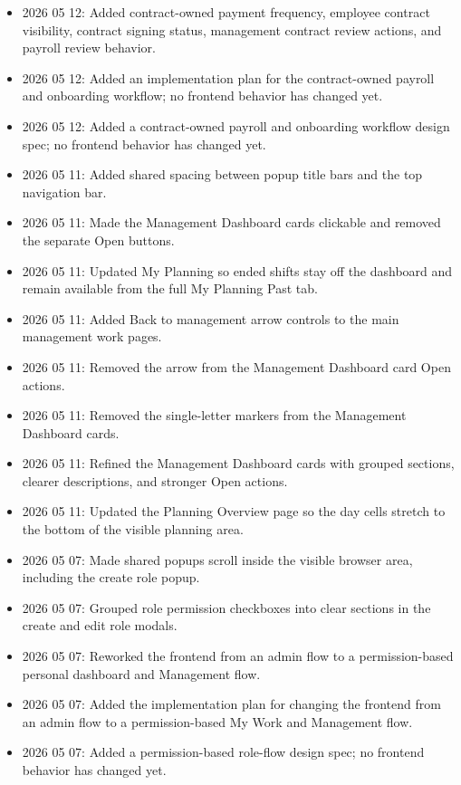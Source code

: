 \documentclass[11pt]{article}
\begin{document}
\begin{itemize}
    \item 2026 05 12: Added contract-owned payment frequency, employee contract visibility, contract signing status, management contract review actions, and payroll review behavior.
    \item 2026 05 12: Added an implementation plan for the contract-owned payroll and onboarding workflow; no frontend behavior has changed yet.
    \item 2026 05 12: Added a contract-owned payroll and onboarding workflow design spec; no frontend behavior has changed yet.
    \item 2026 05 11: Added shared spacing between popup title bars and the top navigation bar.
    \item 2026 05 11: Made the Management Dashboard cards clickable and removed the separate Open buttons.
    \item 2026 05 11: Updated My Planning so ended shifts stay off the dashboard and remain available from the full My Planning Past tab.
    \item 2026 05 11: Added Back to management arrow controls to the main management work pages.
    \item 2026 05 11: Removed the arrow from the Management Dashboard card Open actions.
    \item 2026 05 11: Removed the single-letter markers from the Management Dashboard cards.
    \item 2026 05 11: Refined the Management Dashboard cards with grouped sections, clearer descriptions, and stronger Open actions.
    \item 2026 05 11: Updated the Planning Overview page so the day cells stretch to the bottom of the visible planning area.
    \item 2026 05 07: Made shared popups scroll inside the visible browser area, including the create role popup.
    \item 2026 05 07: Grouped role permission checkboxes into clear sections in the create and edit role modals.
    \item 2026 05 07: Reworked the frontend from an admin flow to a permission-based personal dashboard and Management flow.
    \item 2026 05 07: Added the implementation plan for changing the frontend from an admin flow to a permission-based My Work and Management flow.
    \item 2026 05 07: Added a permission-based role-flow design spec; no frontend behavior has changed yet.
\end{itemize}
\end{document}

